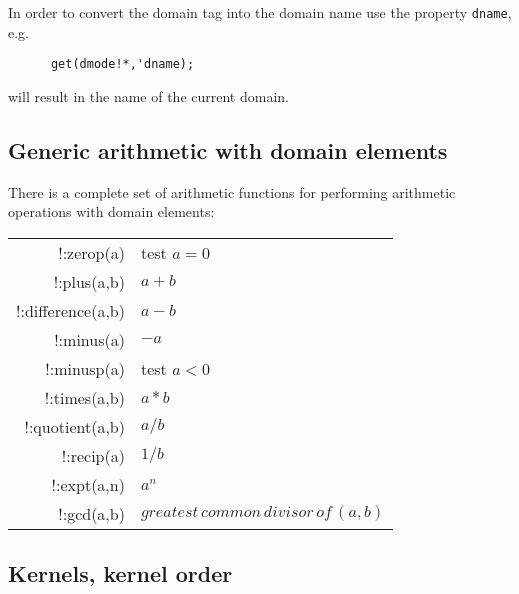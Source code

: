 \documentclass[11pt]{article}
\makeatletter
\newcommand{\ttindex}[1]{\index{#1@{\texttt{#1}}}}
\makeatother
\begin{document}
In order to convert the domain tag into the domain name
use the property {\tt dname}\ttindex{dname}, e.g.
\begin{verbatim}
      get(dmode!*,'dname);
\end{verbatim}
will result in the name of the current domain.

\subsection{Generic arithmetic with domain elements}

There is a complete set of arithmetic functions for performing
arithmetic operations with domain elements:

\begin{center}
\begin{tabular}{|r|l|} \hline
    !:zerop(a)        & test $a=0$ \\
    !:plus(a,b)       & $a+b$ \\
    !:difference(a,b) & $a-b$ \\
    !:minus(a)        & $-a$  \\
    !:minusp(a)       & test $a<0$ \\
    !:times(a,b)      & $a*b$ \\
    !:quotient(a,b)   & $a/b$ \\
    !:recip(a)        & $1/b$ \\
    !:expt(a,n)       & $a^n$ \\
    !:gcd(a,b)  & $greatest\, common\, divisor\, of\,(a,b)$ \\
\hline
\end{tabular}
\end{center}

\subsection{Kernels, kernel order}
\end{document}
